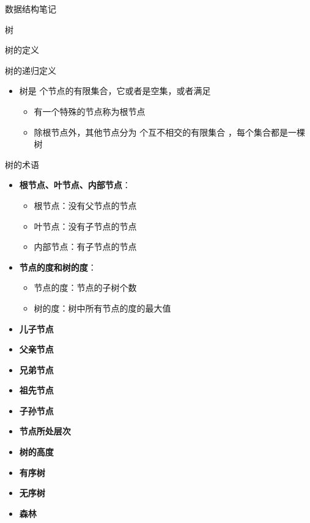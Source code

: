 \documentclass[
  ignorenonframetext,
]{beamer}
\providecommand{\tightlist}{%
  \setlength{\itemsep}{0pt}\setlength{\parskip}{0pt}}
\begin{document}
\begin{frame}[fragile]{数据结构笔记}
\begin{block}{树}
\protect{}\label{ux6811}
\begin{block}{树的定义}
\protect{}\label{ux6811ux7684ux5b9aux4e49}
\begin{block}{树的递归定义}
\protect{}\label{ux6811ux7684ux9012ux5f52ux5b9aux4e49}
\begin{itemize}
\tightlist
\item
  树是 {} 个节点的有限集合，它或者是空集，或者满足

  \begin{itemize}
  \tightlist
  \item
    有一个特殊的节点称为根节点
  \item
    除根节点外，其他节点分为 {} 个互不相交的有限集合
    {}，每个集合都是一棵树
  \end{itemize}
\end{itemize}
\end{block}

\begin{block}{树的术语}
\protect{}\label{ux6811ux7684ux672fux8bed}
\begin{itemize}
\tightlist
\item
  \textbf{根节点、叶节点、内部节点}：

  \begin{itemize}
  \tightlist
  \item
    根节点：没有父节点的节点
  \item
    叶节点：没有子节点的节点
  \item
    内部节点：有子节点的节点
  \end{itemize}
\item
  \textbf{节点的度和树的度}：

  \begin{itemize}
  \tightlist
  \item
    节点的度：节点的子树个数
  \item
    树的度：树中所有节点的度的最大值
  \end{itemize}
\item
  \textbf{儿子节点}
\item
  \textbf{父亲节点}
\item
  \textbf{兄弟节点}
\item
  \textbf{祖先节点}
\item
  \textbf{子孙节点}
\item
  \textbf{节点所处层次}
\item
  \textbf{树的高度}
\item
  \textbf{有序树}
\item
  \textbf{无序树}
\item
  \textbf{森林}
\end{itemize}
\end{block}


\end{block}
\end{block}
\end{frame}
\end{document}
